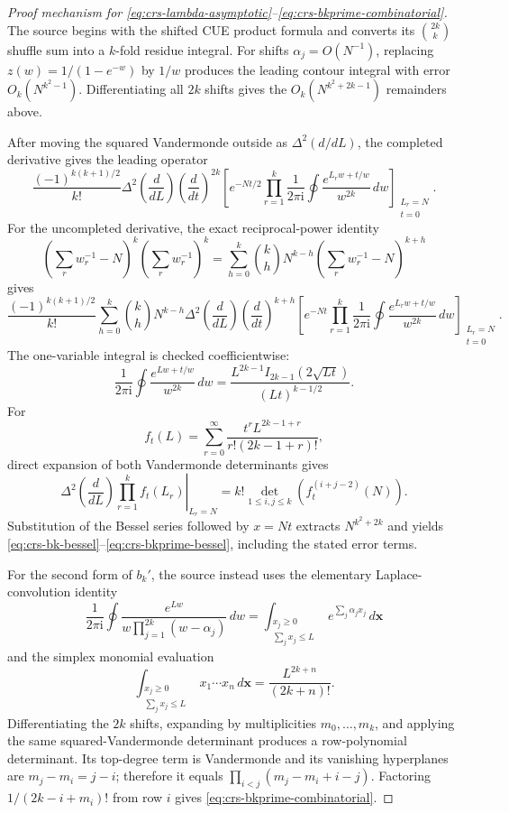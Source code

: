 \begin{proof}[Proof mechanism for
\eqref{eq:crs-lambda-asymptotic}--\eqref{eq:crs-bkprime-combinatorial}]
The source begins with the shifted CUE product formula and converts its
$\binom{2k}{k}$ shuffle sum into a $k$-fold residue integral.  For shifts
$\alpha_j=O(N^{-1})$, replacing
$z(w)=1/(1-e^{-w})$ by $1/w$ produces the leading contour integral with
error $O_k(N^{k^2-1})$.  Differentiating all $2k$ shifts gives the
$O_k(N^{k^2+2k-1})$ remainders above.

After moving the squared Vandermonde outside as
$\Delta^2(d/dL)$, the completed derivative gives the leading operator
\begin{equation}
 \frac{(-1)^{k(k+1)/2}}{k!}
 \Delta^2\!\left(\frac d{dL}\right)
 \left(\frac d{dt}\right)^{2k}
 \left[
 e^{-Nt/2}
 \prod_{r=1}^{k}
 \frac1{2\pi\mathrm i}\oint
 \frac{e^{L_rw+t/w}}{w^{2k}}\,dw
 \right]_{\substack{L_r=N\\t=0}}.
 \label{eq:crs-z-leading-operator}
\end{equation}
For the uncompleted derivative, the exact reciprocal-power identity
\[
 \left(\sum_r w_r^{-1}-N\right)^k
 \left(\sum_r w_r^{-1}\right)^k
 =
 \sum_{h=0}^{k}\binom{k}{h}N^{k-h}
 \left(\sum_r w_r^{-1}-N\right)^{k+h}
\]
gives
\begin{equation}
 \frac{(-1)^{k(k+1)/2}}{k!}
 \sum_{h=0}^{k}\binom{k}{h}N^{k-h}
 \Delta^2\!\left(\frac d{dL}\right)
 \left(\frac d{dt}\right)^{k+h}
 \left[
 e^{-Nt}
 \prod_{r=1}^{k}
 \frac1{2\pi\mathrm i}\oint
 \frac{e^{L_rw+t/w}}{w^{2k}}\,dw
 \right]_{\substack{L_r=N\\t=0}}.
 \label{eq:crs-lambda-leading-operator}
\end{equation}
The one-variable integral is checked coefficientwise:
\[
 \frac1{2\pi\mathrm i}\oint
 \frac{e^{Lw+t/w}}{w^{2k}}\,dw
 =
 \frac{L^{2k-1}I_{2k-1}(2\sqrt{Lt})}{(Lt)^{k-1/2}}.
\]
For
\[
 f_t(L)=\sum_{r=0}^{\infty}
 \frac{t^rL^{2k-1+r}}{r!(2k-1+r)!},
\]
direct expansion of both Vandermonde determinants gives
\[
 \left.
 \Delta^2\!\left(\frac d{dL}\right)
 \prod_{r=1}^{k}f_t(L_r)\right|_{L_r=N}
 =
 k!\det_{1\leq i,j\leq k}
 \left(f_t^{(i+j-2)}(N)\right).
\]
Substitution of the Bessel series followed by $x=Nt$ extracts
$N^{k^2+2k}$ and yields
\eqref{eq:crs-bk-bessel}--\eqref{eq:crs-bkprime-bessel}, including the
stated error terms.

For the second form of $b_k'$, the source instead uses the elementary
Laplace-convolution identity
\[
 \frac1{2\pi\mathrm i}\oint
 \frac{e^{Lw}}{w\prod_{j=1}^{2k}(w-\alpha_j)}\,dw
 =
 \int_{\substack{x_j\geq0\\\sum_jx_j\leq L}}
 e^{\sum_j\alpha_jx_j}\,d\mathbf x
\]
and the simplex monomial evaluation
\[
 \int_{\substack{x_j\geq0\\\sum_jx_j\leq L}}
 x_1\cdots x_n\,d\mathbf x
 =\frac{L^{2k+n}}{(2k+n)!}.
\]
Differentiating the $2k$ shifts, expanding by multiplicities
$m_0,\ldots,m_k$, and applying the same squared-Vandermonde determinant
produces a row-polynomial determinant.  Its top-degree term is Vandermonde
and its vanishing hyperplanes are $m_j-m_i=j-i$; therefore it equals
$\prod_{i<j}(m_j-m_i+i-j)$.  Factoring
$1/(2k-i+m_i)!$ from row $i$ gives
\eqref{eq:crs-bkprime-combinatorial}.
\end{proof}

